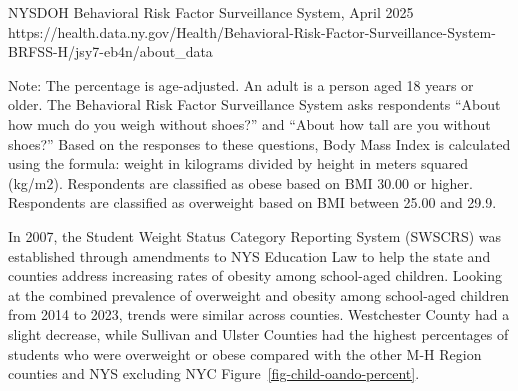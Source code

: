 \documentclass[
  english,
  letterpaper,
]{report}
\begin{document}
\begin{tcolorbox}[enhanced jigsaw, breakable, leftrule=.75mm, title=\textcolor{quarto-callout-note-color}{\faInfo}\hspace{0.5em}{Source}, bottomrule=.15mm, opacityback=0, left=2mm, colback=white, bottomtitle=1mm, coltitle=black, colbacktitle=quarto-callout-note-color!10!white, colframe=quarto-callout-note-color-frame, opacitybacktitle=0.6, toptitle=1mm, titlerule=0mm, arc=.35mm, rightrule=.15mm, toprule=.15mm]

NYSDOH Behavioral Risk Factor Surveillance System, April 2025
https://health.data.ny.gov/Health/Behavioral-Risk-Factor-Surveillance-System-BRFSS-H/jsy7-eb4n/about\_data

\end{tcolorbox}

\begin{tcolorbox}[enhanced jigsaw, breakable, leftrule=.75mm, title=\textcolor{quarto-callout-note-color}{\faInfo}\hspace{0.5em}{Note}, bottomrule=.15mm, opacityback=0, left=2mm, colback=white, bottomtitle=1mm, coltitle=black, colbacktitle=quarto-callout-note-color!10!white, colframe=quarto-callout-note-color-frame, opacitybacktitle=0.6, toptitle=1mm, titlerule=0mm, arc=.35mm, rightrule=.15mm, toprule=.15mm]

Note: The percentage is age-adjusted. An adult is a person aged 18 years
or older. The Behavioral Risk Factor Surveillance System asks
respondents ``About how much do you weigh without shoes?'' and ``About
how tall are you without shoes?'' Based on the responses to these
questions, Body Mass Index is calculated using the formula: weight in
kilograms divided by height in meters squared (kg/m2). Respondents are
classified as obese based on BMI 30.00 or higher. Respondents are
classified as overweight based on BMI between 25.00 and 29.9.

\end{tcolorbox}

In 2007, the Student Weight Status Category Reporting System (SWSCRS)
was established through amendments to NYS Education Law to help the
state and counties address increasing rates of obesity among school-aged
children. Looking at the combined prevalence of overweight and obesity
among school-aged children from 2014 to 2023, trends were similar across
counties. Westchester County had a slight decrease, while Sullivan and
Ulster Counties had the highest percentages of students who were
overweight or obese compared with the other M-H Region counties and NYS
excluding NYC Figure~\ref{fig-child-oando-percent}.
\end{document}
